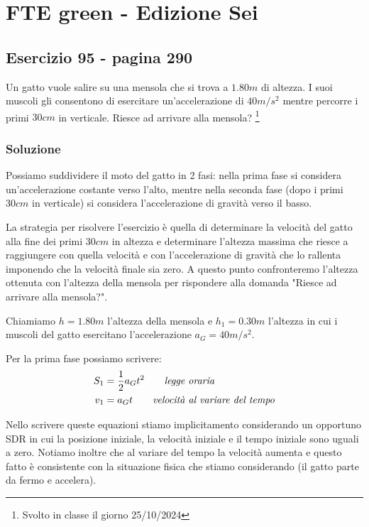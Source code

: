 \documentclass{article}
\begin{document}
\newpage
\section{FTE green - Edizione Sei}
\subsection{Esercizio 95 - pagina 290}
Un gatto vuole salire su una mensola che si trova a $1.80m$ di altezza. I suoi muscoli gli consentono di esercitare un'accelerazione di $40m/s^2$ mentre percorre i primi $30cm$ in verticale. Riesce ad arrivare alla mensola? \footnote{Svolto in classe il giorno 25/10/2024}

\subsubsection{Soluzione}

Possiamo suddividere il moto del gatto in 2 fasi: nella prima fase si considera un'accelerazione costante verso l'alto, mentre nella seconda fase (dopo i primi $30cm$ in verticale) si considera l'accelerazione di gravità verso il basso. 

La strategia per risolvere l'esercizio è quella di determinare la velocità del gatto alla fine dei primi $30cm$ in altezza e determinare l'altezza massima che riesce a raggiungere con quella velocità e con l'accelerazione di gravità che lo rallenta imponendo che la velocità finale sia zero. A questo punto confronteremo l'altezza ottenuta con l'altezza della mensola per rispondere alla domanda "Riesce ad arrivare alla mensola?".

Chiamiamo $h=1.80m$ l'altezza della mensola e $h_1=0.30m$ l'altezza in cui i muscoli del gatto esercitano l'accelerazione $a_G=40m/s^2$.

Per la prima fase possiamo scrivere:
\begin{align}
  S_1 &= \frac{1}{2}a_G t^2 \qquad\text{\textit{legge oraria}} \\
  v_1 &= a_G t \qquad\text{\textit{velocità al variare del tempo}} \label{v1t}
\end{align}

Nello scrivere queste equazioni stiamo implicitamento considerando un opportuno SDR in cui la posizione iniziale, la velocità iniziale e il tempo iniziale sono uguali a zero. Notiamo inoltre che al variare del tempo la velocità aumenta e questo fatto è consistente con la situazione fisica che stiamo considerando (il gatto parte da fermo e accelera).
\end{document}
